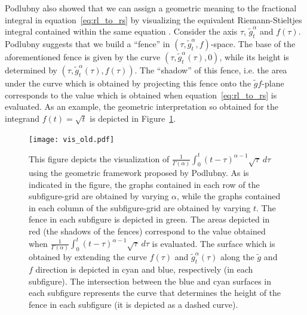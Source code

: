 \documentclass[twoside,reqno,11pt]{fcaa-var} %
\begin{document}
\noindent
Podlubny also showed that we can assign a geometric meaning to the fractional integral in equation~\eqref{eq:rl_to_rs} by visualizing the equivalent Riemann-Stieltjes integral contained within the same equation \cite{bullock88,podlubny02}. Consider the axis $\tau$, $\widetilde{g}_t^{\alpha}$ and $f(\tau)$. Podlubny suggests that we build a ``fence'' in $(\tau,\widetilde{g}_t^{\alpha},f)$-space. The base of the aforementioned fence is given by the curve $(\tau,\widetilde{g}_t^{\alpha}(\tau),0)$, while its height is determined by $(\tau,\widetilde{g}_t^{\alpha}(\tau),f(\tau))$. The ``shadow'' of this fence, i.e. the area under the curve which is obtained by projecting this fence onto the $\widetilde{g}f$-plane corresponds to the value which is obtained when equation~\eqref{eq:rl_to_rs} is evaluated. As an example, the geometric interpretation so obtained for the integrand $f(t)=\sqrt{t}$ is depicted in Figure~\ref{fig:vis_old}.



\begin{figure}[htb]
\centering
\texttt{[image: vis\_old.pdf]}
\caption{This figure depicts the visualization of $\frac{1}{\Gamma(\alpha)}\int_{0}^{t}(t-\tau)^{\alpha-1}\sqrt{\tau}~d\tau$ using the geometric framework proposed by Podlubny.
As is indicated in the figure, the graphs contained in each row of the subfigure-grid are obtained by varying $\alpha$, while the graphs contained in each column of the subfigure-grid are obtained by varying $t$. The fence in each subfigure is depicted in green. The areas depicted in red (the shadows of the fences) correspond to the value obtained when $\frac{1}{\Gamma(\alpha)}\int_{0}^{t}(t-\tau)^{\alpha-1}\sqrt{\tau}~d\tau$ is evaluated.  The surface which is obtained by extending the curve $f(\tau)$ and $\widetilde{g}_t^{\alpha}(\tau)$ along the $\widetilde{g}$ and $f$ direction is depicted in cyan and blue, respectively (in each subfigure). The intersection between the blue and cyan surfaces in each subfigure represents the curve that determines the height of the fence in each subfigure (it is depicted as a dashed curve).   
}
\label{fig:vis_old}
\end{figure}
\end{document}
